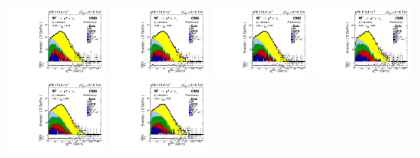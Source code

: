 \begin{figure}[htb!]
\begin{tiny}
\\
\includegraphics[width=0.23\textwidth]{Figures/WBoson/Analysis/SignalExtraction/Signal/LOG/PLOT_MET_DATA_WToMuPl_PA_Model_TEMP_WDYDYToTauWToTauTTbar_ModifiedRayleigh_QCD_MuEtaCM_-40_-20_MuIso_0_15.pdf}
\includegraphics[width=0.23\textwidth]{Figures/WBoson/Analysis/SignalExtraction/Signal/LOG/PLOT_MET_DATA_WToMuPl_PA_Model_TEMP_WDYDYToTauWToTauTTbar_ModifiedRayleigh_QCD_MuEtaCM_-20_0_MuIso_0_15.pdf}
\includegraphics[width=0.23\textwidth]{Figures/WBoson/Analysis/SignalExtraction/Signal/LOG/PLOT_MET_DATA_WToMuPl_PA_Model_TEMP_WDYDYToTauWToTauTTbar_ModifiedRayleigh_QCD_MuEtaCM_0_20_MuIso_0_15.pdf}
\includegraphics[width=0.23\textwidth]{Figures/WBoson/Analysis/SignalExtraction/Signal/LOG/PLOT_MET_DATA_WToMuPl_PA_Model_TEMP_WDYDYToTauWToTauTTbar_ModifiedRayleigh_QCD_MuEtaCM_20_40_MuIso_0_15.pdf}
\\
\includegraphics[width=0.23\textwidth]{Figures/WBoson/Analysis/SignalExtraction/Signal/LOG/PLOT_MET_DATA_WToMuPl_PA_Model_TEMP_WDYDYToTauWToTauTTbar_ModifiedRayleigh_QCD_MuEtaCM_40_60_MuIso_0_15.pdf}
\includegraphics[width=0.23\textwidth]{Figures/WBoson/Analysis/SignalExtraction/Signal/LOG/PLOT_MET_DATA_WToMuPl_PA_Model_TEMP_WDYDYToTauWToTauTTbar_ModifiedRayleigh_QCD_MuEtaCM_60_80_MuIso_0_15.pdf}

\end{tiny}
\end{figure}
